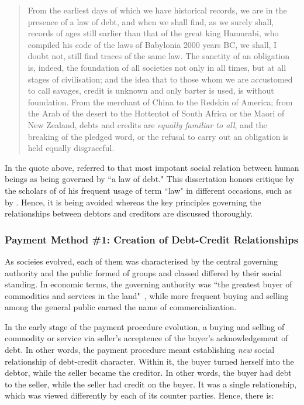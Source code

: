 \begin{quote}
From the earliest days of which we have historical records, we are in the presence of a law of  debt, and when we shall find, as we surely shall, records of ages still earlier
 than that of the great king Hamurabi, who compiled his code of the laws
 of Babylonia 2000 years BC, we shall, I doubt not, still find traces of the
 same law. The sanctity of an obligation is, indeed, the foundation of all
 societies not only in all times, but at all stages of civilisation; and the idea
 that to those whom we are accustomed to call savages, credit is unknown
 and only barter is used, is without foundation. From the merchant of
 China to the Redskin of America; from the Arab of the desert to the
 Hottentot of South Africa or the Maori of New Zealand, debts and
 credits are \textit{equally familiar to all}, and the breaking of the pledged word, or 
the refusal to carry out an obligation is held equally disgraceful. \citep[p.~391, emphasis added]{innes1913}
\end{quote}

In the quote above, \citeauthor{innes1913} referred to that most impotant social relation between human beings as being governed by ``a law of debt." This dissertation honors critique  by the scholars of \citeauthor{innes1913} of his frequent usage of term ``law" in different occasions, such as by \cite{ingham2004}. Hence, it is being avoided whereas the key principles governing the relationships between debtors and creditors are discussed thoroughly. 

\subsubsection*{Payment Method \#1: Creation of Debt-Credit Relationships}

As socieies evolved, each of them was characterised by the central governing authority and the public formed of groups and classed differed by their social standing. In economic terms, the governing authority was ``the greatest buyer of commodities and services in the land"~\citep[p.~152]{innes1914}, while more frequent buying and selling among the general public earned the name of commercialization. 

In the early stage of the payment procedure evolution, a buying and selling of commodity or service via seller's acceptence of the buyer's acknowledgement of debt. In other words, the payment procedure meant establishing \textit{new} social relationship of debt-credit character. Within it, the buyer turned herself into the debtor, while the seller became the creditor. In other words, the buyer had debt to the seller, while the seller had credit on the buyer. It was a single relationship, which was viewed differently by each of its counter parties. Hence, there is:

